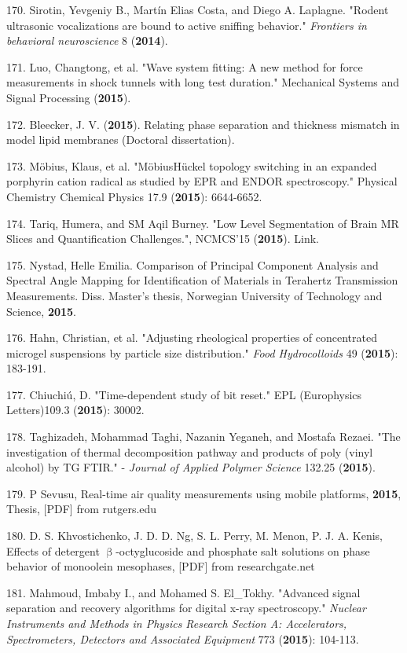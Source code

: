 170. Sirotin, Yevgeniy B., Mart\'{i}n Elias Costa, and Diego A. Laplagne. "Rodent ultrasonic vocalizations are bound to active sniffing behavior." \textit{Frontiers in behavioral neuroscience} 8 (\textbf{2014}).

171. Luo, Changtong, et al. "Wave system fitting: A new method for force measurements in shock tunnels with long test duration." Mechanical Systems and Signal Processing (\textbf{2015}).

172. Bleecker, J. V. (\textbf{2015}). Relating phase separation and thickness mismatch in model lipid membranes (Doctoral dissertation).

173. M\"{o}bius, Klaus, et al. "M\"{o}bius\textendash{}H\"{u}ckel topology switching in an expanded porphyrin cation radical as studied by EPR and ENDOR spectroscopy." Physical Chemistry Chemical Physics 17.9 (\textbf{2015}): 6644-6652.

174. Tariq, Humera, and SM Aqil Burney. "Low Level Segmentation of Brain MR Slices and Quantification Challenges.", NCMCS'15 (\textbf{2015}). Link.

175. Nystad, Helle Emilia. Comparison of Principal Component Analysis and Spectral Angle Mapping for Identification of Materials in Terahertz Transmission Measurements. Diss. Master’s thesis, Norwegian University of Technology and Science, \textbf{2015}.

176. Hahn, Christian, et al. "Adjusting rheological properties of concentrated microgel suspensions by particle size distribution." \textit{Food Hydrocolloids} 49 (\textbf{2015}): 183-191.

177. Chiuchi\'{u}, D. "Time-dependent study of bit reset." EPL (Europhysics Letters)109.3 (\textbf{2015}): 30002.

178. Taghizadeh, Mohammad Taghi, Nazanin Yeganeh, and Mostafa Rezaei. "The investigation of thermal decomposition pathway and products of poly (vinyl alcohol) by TG FTIR." - \textit{Journal of Applied Polymer Science} 132.25 (\textbf{2015}).

179. P Sevusu, Real-time air quality measurements using mobile platforms, \textbf{2015}, Thesis, [PDF] from rutgers.edu

180. D. S. Khvostichenko, J. D. D. Ng, S. L. Perry, M. Menon, P. J. A. Kenis, Effects of detergent ${\upbeta}$-octyglucoside and phosphate salt solutions on phase behavior of monoolein mesophases, [PDF] from researchgate.net

181. Mahmoud, Imbaby I., and Mohamed S. El\_Tokhy. "Advanced signal separation and recovery algorithms for digital x-ray spectroscopy." \textit{Nuclear Instruments and Methods in Physics Research Section A: Accelerators, Spectrometers, Detectors and Associated Equipment} 773 (\textbf{2015}): 104-113.

